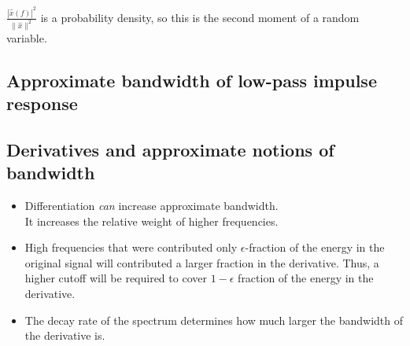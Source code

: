 \documentclass{ximera}
\begin{document}
$\frac{|\hat{x}(f)|^2}{\|\hat{x}\|^2}$ is a probability density, so this is the second moment of a random variable. 


  


\subsection{Approximate bandwidth of low-pass impulse response}




\subsection{Derivatives and approximate notions of bandwidth}
  \begin{itemize}
  \item
    Differentiation \emph{can} increase approximate bandwidth.\\
    It increases the relative weight of higher frequencies.
  \item High frequencies that were contributed only $\epsilon$-fraction of the energy in the original signal will contributed a larger fraction in the derivative. Thus, a higher cutoff will be required to cover $1-\epsilon$ fraction of the energy in the derivative.
  \item The decay rate of the spectrum determines how much larger the bandwidth of the derivative is.
  \end{itemize}
\end{document}
